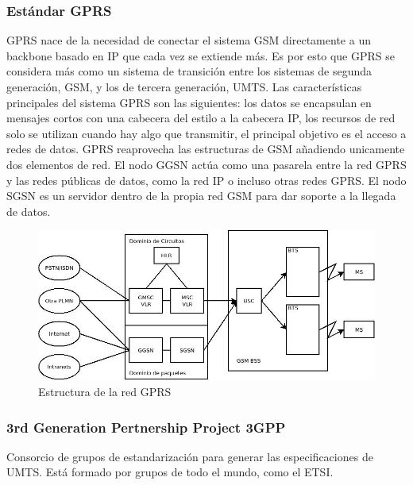 \subsubsection{Estándar GPRS}
\label{ssub:GPRS}
	GPRS nace de la necesidad de conectar el sistema GSM directamente a un backbone basado en IP que cada vez se extiende más. Es por esto que GPRS se considera más como un sistema de transición entre los sistemas de segunda generación, GSM, y los de tercera generación, UMTS. Las características principales del sistema GPRS son las siguientes: los datos se encapsulan en mensajes cortos con una cabecera del estilo a la cabecera IP, los recursos de red solo se utilizan cuando hay algo que transmitir, el principal objetivo es el acceso a redes de datos. GPRS reaprovecha las estructuras de GSM añadiendo unicamente dos elementos de red. El nodo GGSN actúa como una pasarela entre la red GPRS y las redes públicas de datos, como la red IP o incluso otras redes GPRS. El nodo SGSN es un servidor dentro de la propia red GSM para dar soporte a la llegada de datos.
\begin{figure}[H]
\centering
\includegraphics[width=\textwidth]{Imagen/diaGPRS.jpg}
\caption{Estructura de la red GPRS}
\label{img:estructuraGPRS}
\end{figure}
\subsubsection{3rd Generation Pertnership Project 3GPP}
\label{ssub:3GPP}
	Consorcio de grupos de estandarización para generar las especificaciones de UMTS. Está formado por grupos de todo el mundo, como el ETSI. 
